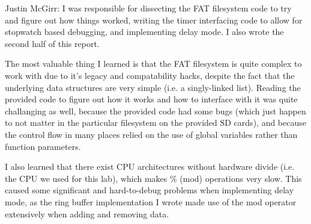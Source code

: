 \documentclass[12pt]{article}
\begin{document}
Justin McGirr:
I was responsible for dissecting the FAT filesystem code to try and figure out
how things worked, writing the timer interfacing code to allow for stopwatch
based debugging, and implementing delay mode. I also wrote the second half of
this report.

The most valuable thing I learned is that the FAT filesystem is quite complex
to work with due to it's legacy and compatability hacks, despite the fact that
the underlying data structures are very simple (i.e. a singly-linked list).
Reading the provided code to figure out how it works and how to interface with
it was quite challanging as well, because the provided code had some bugs
(which just happen to not matter in the particular filesystem on the provided
SD cards), and because the control flow in many places relied on the use of
global variables rather than function parameters.

I also learned that there exist CPU architectures without hardware divide
(i.e. the CPU we used for this lab), which makes \% (mod) operations very
slow. This caused some significant and hard-to-debug problems when implementing
delay mode, as the ring buffer implementation I wrote made use of the mod
operator extensively when adding and removing data.
\end{document}
